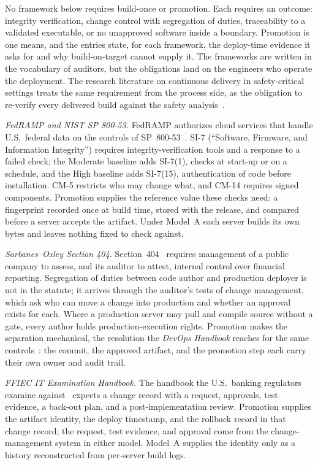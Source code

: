 \documentclass[11pt]{article}
\begin{document}
No framework below requires build-once or promotion. Each requires an outcome: integrity verification, change control with segregation of duties, traceability to a validated executable, or no unapproved software inside a boundary. Promotion is one means, and the entries state, for each framework, the deploy-time evidence it asks for and why build-on-target cannot supply it. The frameworks are written in the vocabulary of auditors, but the obligations land on the engineers who operate the deployment. The research literature on continuous delivery in safety-critical settings treats the same requirement from the process side, as the obligation to re-verify every delivered build against the safety analysis~\cite{VostWagner}.

\textit{FedRAMP and NIST SP 800-53.} FedRAMP authorizes cloud services that handle U.S.\ federal data on the controls of SP~800-53~\cite{NIST80053}. SI-7 (``Software, Firmware, and Information Integrity'') requires integrity-verification tools and a response to a failed check; the Moderate baseline adds SI-7(1), checks at start-up or on a schedule, and the High baseline adds SI-7(15), authentication of code before installation. CM-5 restricts who may change what, and CM-14 requires signed components. Promotion supplies the reference value these checks need: a fingerprint recorded once at build time, stored with the release, and compared before a server accepts the artifact. Under Model~A each server builds its own bytes and leaves nothing fixed to check against.

\textit{Sarbanes--Oxley Section 404.} Section~404~\cite{SOX} requires management of a public company to assess, and its auditor to attest, internal control over financial reporting. Segregation of duties between code author and production deployer is not in the statute; it arrives through the auditor's tests of change management, which ask who can move a change into production and whether an approval exists for each. Where a production server may pull and compile source without a gate, every author holds production-execution rights. Promotion makes the separation mechanical, the resolution the \emph{DevOps Handbook} reaches for the same controls~\cite{DevOpsHandbook}: the commit, the approved artifact, and the promotion step each carry their own owner and audit trail.

\textit{FFIEC IT Examination Handbook.} The handbook the U.S.\ banking regulators examine against~\cite{FFIEC} expects a change record with a request, approvals, test evidence, a back-out plan, and a post-implementation review. Promotion supplies the artifact identity, the deploy timestamp, and the rollback record in that change record; the request, test evidence, and approval come from the change-management system in either model. Model~A supplies the identity only as a history reconstructed from per-server build logs.
\end{document}
